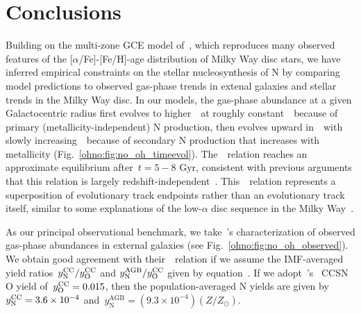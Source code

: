 
\section{Conclusions}
\label{ohno:sec:conclusions}

Building on the multi-zone GCE model of~\citet{Johnson2021}, which reproduces
many observed features of the [$\alpha$/Fe]-[Fe/H]-age distribution of Milky
Way disc stars, we have inferred empirical constraints on the stellar
nucleosynthesis of N by comparing model predictions to observed gas-phase trends
in extenal galaxies and stellar trends in the Milky Way disc.
In our models, the gas-phase abundance at a given Galactocentric radius first
evolves to higher~\oh~at roughly constant~\no~because of primary
(metallicity-independent) N production, then evolves upward in~\no~with slowly
increasing~\oh~because of secondary N production that increases with
metallicity (Fig.~\ref{ohno:fig:no_oh_timeevol}).
The~\ohno~relation reaches an approximate equilibrium after~$t = 5 - 8$ Gyr,
consistent with previous arguments that this relation is largely
redshift-independent~\citep{Vincenzo2018, HaydenPawson2022}.
This~\ohno~relation represents a superposition of evolutionary track endpoints
rather than an evolutionary track itself, similar to some explanations of the
low-$\alpha$ disc sequence in the Milky Way~\citep[e.g.][]{Schoenrich2009a,
Nidever2014, Buck2020b, Sharma2021, Johnson2021}.
\par
As our principal observational benchmark, we take~\citeauthor{Dopita2016}'s
\citeyearpar{Dopita2016} characterization of observed gas-phase abundances
in external galaxies (see Fig.~\ref{ohno:fig:no_oh_observed}).
We obtain good agreement with their~\ohno~relation if we assume the
IMF-averaged yield ratios~$y_\text{N}^\text{CC} / y_\text{O}^\text{CC}$ and
$y_\text{N}^\text{AGB} / y_\text{O}^\text{CC}$ given by
equation~.
If we adopt~\citeauthor{Johnson2021}'s~\citeyearpar{Johnson2021} CCSN O yield
of~$y_\text{O}^\text{CC} = 0.015$, then the population-averaged N yields are given by
$y_\text{N}^\text{CC} = 3.6\times10^{-4}$
and~$y_\text{N}^\text{AGB} = (9.3\times10^{-4}) (Z / Z_\odot)$.
